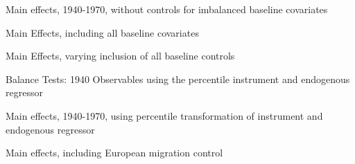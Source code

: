 \documentclass{article}
\begin{document}
\footnotesize
\begin{table}[htbp]
\footnotesize
\centering {}  \begin{threeparttable} \caption{Main effects, 1940-1970, without controls for imbalanced baseline covariates}  \label{tab:main_effect_noctrl}
     \end{threeparttable}
 \end{table}
\clearpage


\footnotesize
\begin{table}[htbp]
\centering
\scriptsize
\begin{threeparttable}
\caption{Main Effects, including all baseline covariates}
\label{tab:allctrls}
        \end{threeparttable}
 \end{table}
\clearpage


\begin{table}[htbp]
\centering
\tiny
\begin{threeparttable}
\caption{Main Effects, varying inclusion of all baseline controls}
\label{tab:varyctrl}
     \end{threeparttable}
 \end{table}
\clearpage



\begin{table}[htbp]\centering 
 \begin{threeparttable} \caption{Balance Tests: 1940 Observables using the percentile instrument and endogenous regressor}\label{tab:balance_pctile}
     \end{threeparttable} \end{table}


\begin{table}[htbp]
\footnotesize
\centering {}  \begin{threeparttable} \caption{Main effects, 1940-1970, using percentile transformation of instrument and endogenous regressor}\label{tab:main_effect_pctile}
    
 \end{threeparttable} 
\end{table}
\clearpage



\footnotesize
\begin{table}[htbp]
\footnotesize
\centering {}  \begin{threeparttable} \caption{Main effects, including European migration control} \label{tab:main_effect_eurmig}
     \end{threeparttable}
 \end{table}
\clearpage
\end{document}
